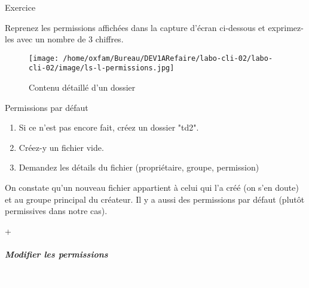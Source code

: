\documentclass[a4paper,11pt]{article}
\begin{document}
\begin{Exercice}{Exercice}
					\textcolor{white}{.} \par

\par

Reprenez les permissions affich\'ees dans la capture d'\'ecran ci-dessous 
et exprimez-les avec un nombre de 3 chiffres.  

\par
\begin{figure}[hbt]
	\begin{center}
		\texttt{[image: /home/oxfam/Bureau/DEV1ARefaire/labo-cli-02/labo-cli-02/image/ls-l-permissions.jpg]}
		
	\end{center}
	
	\caption[Contenu d\'etaill\'e d'un dossier]{Contenu d\'etaill\'e d'un dossier}
\end{figure}
\end{Exercice}
		
		
\begin{Tutoriel}{Permissions par d\'efaut} 
		
		
		
		\begin{enumerate}
			
			\item Si ce n'est pas encore fait, cr\'eez un dossier "td2".
			\item Cr\'eez-y un fichier vide.
			\item Demandez les d\'etails du fichier (propri\'etaire, groupe, permission)
		\end{enumerate}
		
		On constate qu'un nouveau fichier appartient \`a celui qui l'a cr\'e\'e 
		(on s'en doute) et au groupe principal du cr\'eateur. 
		Il y a aussi des permissions par d\'efaut (plut\^ot permissives dans notre cas).  
		
	+	\par
\end{Tutoriel}		
		
		\subparagraph{Modifier les permissions} 

\textcolor{white}{.} \par

\par
\end{document}
